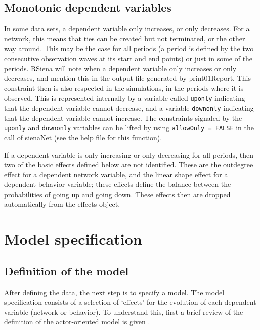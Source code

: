 \documentclass[a4paper,fleqn,11pt]{article}
\newcommand{\+}{\, + \,}
\newcommand{\sfn}[1]{\textsf{#1}}
\newcommand{\RS}{{\sf RSiena }}
\begin{document}
{\subsection{Monotonic dependent variables}
\label{S_monotone}

In some data sets, a dependent variable only increases, or only decreases.
For a network, this means that ties can be created but not terminated,
or the other way around.
This may be the case for all periods (a period is defined by the
two consecutive observation waves at its start and end points)
or just in some of the periods.
\RS will note when a dependent variable only increases or only decreases,
and mention this in the output file generated by \textsf{print01Report}.
This constraint then is also respected in the simulations, in the periods
where it is observed.
This is represented
internally by a variable called \texttt{uponly} indicating that the
dependent variable cannot decrease,
and a variable \texttt{downonly} indicating that the
dependent variable cannot increase.
The constraints signaled by the  \texttt{uponly} and  \texttt{downonly}
variables can be lifted by using \texttt{allowOnly = FALSE}
in the call of \sfn{sienaNet} (see the help file for this function).

If a dependent variable is only increasing or only decreasing
for all periods, then two of the basic effects defined below
are not identified.
These are the outdegree effect for a dependent network variable,
and the linear shape effect for a dependent behavior variable;
these effects define the balance between the probabilities of
going up and going down.
These effects then are dropped automatically from the effects object,


\newpage
\section{Model specification}
\label{S_modspec}

\subsection{Definition of the model}
\label{S_defmod}

After defining the data, the next step is to specify a model.
The model specification consists of a selection of `effects'
for the evolution of each dependent variable (network or behavior).
To understand this, first a brief review of the definition of the
actor-oriented model is given
\citep*[for further explanations see][]{Snijders01, Snijders05,
SnijdersEA07, SnijdersEA10b}.

}
\end{document}
